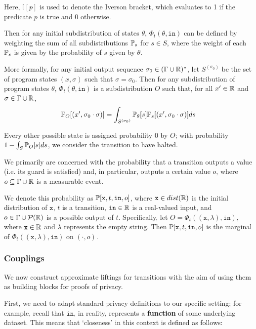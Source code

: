 Here, $\mathbb{I}[p]$ is used to denote the Iverson bracket, which evaluates to 1 if the predicate $p$ is true and 0 otherwise.

Then for any initial subdistribution of states $\theta$, $\Phi_t(\theta, \texttt{in})$ can be defined by weighting the sum of all subdistributions $\mathbb{P}_s$ for $s\in S$, where the weight of each $\mathbb{P}_s$ is given by the probability of $s$ given by $\theta$. 

More formally, for any initial output sequence $\sigma_0\in (\Gamma\cup\mathbb{R})^*$, let $S^{(\sigma_0)}$ be the set of program states $(x, \sigma)$ such that $\sigma = \sigma_0$. Then for any subdistribution of program states $\theta$, $\Phi_t(\theta, \texttt{in})$ is a subdistribution $O$ such that, for all $x'\in \mathbb{R}$ and $\sigma \in \Gamma\cup\mathbb{R}$,
\[
  \mathbb{P}_O[(x', \sigma_0\cdot \sigma)] = \int_{S^{(\sigma_0)}}\mathbb{P}_\theta[s]\mathbb{P}_s[(x', \sigma_0\cdot \sigma)]ds
\]

Every other possible state is assigned probability 0 by $O$; with probability $1-\int_S \mathbb{P}_O[s]ds$, we consider the transition to have halted.

We primarily are concerned with the probability that a transition outputs a value (i.e. its guard is satisfied) and, in particular, outputs a certain value $o$, where $o\subseteq \Gamma\cup\mathbb{R}$ is a measurable event.

We denote this probability as $\mathbb{P}[\texttt{x}, t, \texttt{in}, o]$, where $\texttt{x} \in dist(\mathbb{R})$ is the initial distribution of $\texttt{x}$, $t$ is a transition, $\texttt{in}\in \mathbb{R}$ is a real-valued input, and $o\in \Gamma\cup \mathcal{P}(\mathbb{R})$ is a possible output of $t$. 
Specifically, let $O = \Phi_t((\texttt{x}, \lambda), \texttt{in})$, where $\texttt{x}\in \mathbb{R}$ and $\lambda$ represents the empty string. Then $\mathbb{P}[\texttt{x}, t, \texttt{in}, o]$ is the marginal of $\Phi_t((\texttt{x}, \lambda), \texttt{in})$ on $(\cdot, o)$.

\subsubsection{Couplings}

We now construct approximate liftings for transitions with the aim of using them as building blocks for proofs of privacy.

First, we need to adapt standard privacy definitions to our specific setting; for example, recall that $\texttt{in}$, in reality, represents a \textbf{function} of some underlying dataset. This means that `closeness' in this context is defined as follows:

